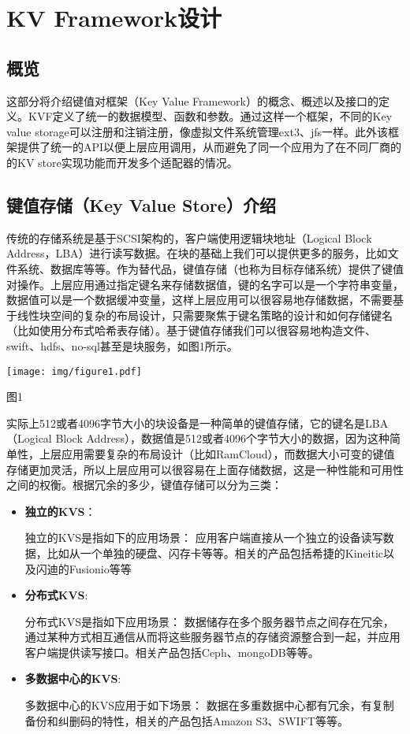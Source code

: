 \chapter{KV Framework设计}
\section{概览}\label{sec:req}
	这部分将介绍键值对框架（Key Value Framework）的概念、概述以及接口的定义。KVF定义了统一的数据模型、函数和参数。通过这样一个框架，不同的Key value storage可以注册和注销注册，像虚拟文件系统管理ext3、jfs一样。此外该框架提供了统一的API以便上层应用调用，从而避免了同一个应用为了在不同厂商的的KV store实现功能而开发多个适配器的情况。
\cite{test-zh}
\section{键值存储（Key Value Store）介绍}\label{sec:doc-dir}
	

		传统的存储系统是基于SCSI架构的，客户端使用逻辑块地址（Logical Block Address，LBA）进行读写数据。在块的基础上我们可以提供更多的服务，比如文件系统、数据库等等。作为替代品，键值存储（也称为目标存储系统）提供了键值对操作。上层应用通过指定键名来存储数据值，键的名字可以是一个字符串变量，数据值可以是一个数据缓冲变量，这样上层应用可以很容易地存储数据，不需要基于线性块空间的复杂的布局设计，只需要聚焦于键名策略的设计和如何存储键名（比如使用分布式哈希表存储）。基于键值存储我们可以很容易地构造文件、swift、hdfs、no-sql甚至是块服务，如图1所示。
	\begin{center}
		\texttt{[image: img/figure1.pdf]}
	\end{center}
	\centerline {图1}
	
		实际上512或者4096字节大小的块设备是一种简单的键值存储，它的键名是LBA（Logical Block Address），数据值是512或者4096个字节大小的数据，因为这种简单性，上层应用需要复杂的布局设计（比如RamCloud），而数据大小可变的键值存储更加灵活，所以上层应用可以很容易在上面存储数据，这是一种性能和可用性之间的权衡。根据冗余的多少，键值存储可以分为三类：
	\begin{itemize}
		\item \textbf{独立的KVS}：
		
			独立的KVS是指如下的应用场景：
			应用客户端直接从一个独立的设备读写数据，比如从一个单独的硬盘、闪存卡等等。相关的产品包括希捷的Kineitic以及闪迪的Fusionio等等

		\item \textbf{分布式KVS}:
		
			分布式KVS是指如下应用场景：
			数据储存在多个服务器节点之间存在冗余，通过某种方式相互通信从而将这些服务器节点的存储资源整合到一起，并应用客户端提供读写接口。相关产品包括Ceph、mongoDB等等。

		\item \textbf{多数据中心的KVS}:
		
			多数据中心的KVS应用于如下场景：
			数据在多重数据中心都有冗余，有复制备份和纠删码的特性，相关的产品包括Amazon S3、SWIFT等等。
	\end{itemize}

